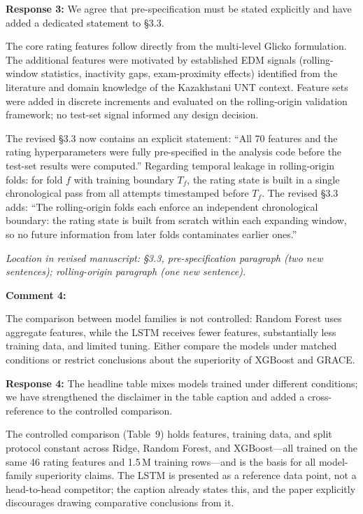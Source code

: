 \documentclass[11pt]{article}
\newcommand{\rev}[1]{{\color{ccolor}#1}}
\begin{document}
\textbf{Response 3:}
We agree that pre-specification must be stated explicitly and have added a dedicated statement to \S3.3.

The core rating features follow directly from the multi-level Glicko formulation.
The additional features were motivated by established EDM signals (rolling-window
statistics, inactivity gaps, exam-proximity effects) identified from the literature
and domain knowledge of the Kazakhstani UNT context. Feature sets were added in
discrete increments and evaluated on the rolling-origin validation framework; no
test-set signal informed any design decision.

\rev{The revised \S3.3 now contains an explicit statement: ``All 70 features and the
rating hyperparameters were fully pre-specified in the analysis code before the
test-set results were computed.''} Regarding temporal leakage in rolling-origin folds:
for fold $f$ with training boundary $T_f$, the rating state is built in a single
chronological pass from all attempts timestamped before $T_f$.
\rev{The revised \S3.3 adds: ``The rolling-origin folds each enforce an independent
chronological boundary: the rating state is built from scratch within each expanding
window, so no future information from later folds contaminates earlier ones.''}

\textit{Location in revised manuscript: \S3.3, pre-specification paragraph
(two new sentences); rolling-origin paragraph (one new sentence).}

\bigskip

\textbf{Comment 4:}
\begin{rquote}
The comparison between model families is not controlled: Random Forest uses aggregate
features, while the LSTM receives fewer features, substantially less training data, and
limited tuning. Either compare the models under matched conditions or restrict
conclusions about the superiority of XGBoost and GRACE.
\end{rquote}

\textbf{Response 4:}
The headline table mixes models trained under different conditions; we have strengthened
the disclaimer in the table caption and added a cross-reference to the controlled comparison.

The controlled comparison (Table~9) holds features, training data, and split protocol
constant across Ridge, Random Forest, and XGBoost---all trained on the same 46 rating
features and 1.5\,M training rows---and is the basis for all model-family superiority
claims. The LSTM is presented as a reference data point, not a head-to-head competitor;
the caption already states this, and the paper explicitly discourages drawing comparative conclusions from it.
\end{document}
